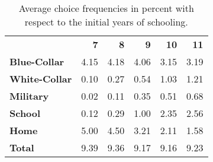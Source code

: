 \begin{ThreePartTable}

	\begin{longtable}[c]{@{}lrrrrr@{}}
		\caption{Average choice frequencies in percent with respect to the initial years of schooling.}
		\label{tab:InitialSchoolingActivity}

		\setlength\extrarowheight{2.5pt}
		
		\\
		\toprule
		
   &	\textbf{7}	&	\textbf{8}	&	\textbf{9}	&	\textbf{10}	&	\textbf{11}	\\ \midrule
		\endfirsthead
\textbf{Blue-Collar}	&	4.15	&	4.18	&	4.06	&	3.15	&	3.19	\\
\textbf{White-Collar}	&	0.10	&	0.27	&	0.54	&	1.03	&	1.21	\\
\textbf{Military}&	0.02	&	0.11	&	0.35	&	0.51	&	0.68	\\
\textbf{School}	&	0.12	&	0.29	&	1.00	&	2.35	&	2.56	\\
\textbf{Home}	&	5.00	&	4.50	&	3.21	&	2.11	&	1.58	\\
\textbf{Total}	&	9.39	&	9.36	&	9.17	&	9.16	&	9.23	\\



  \bottomrule
	\end{longtable}
\end{ThreePartTable}
